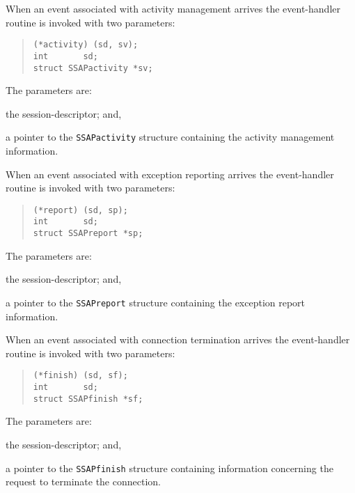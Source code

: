 When an event associated with activity management arrives
the event-handler routine is invoked with two parameters:
\begin{quote}\small\begin{verbatim}
(*activity) (sd, sv);
int       sd;
struct SSAPactivity *sv;
\end{verbatim}\end{quote}
The parameters are:
\begin{describe}
\item[\verb"sd":] the session-descriptor;
and,

\item[\verb"sv":] a pointer to the \verb"SSAPactivity" structure containing
the activity management information.
\end{describe}

When an event associated with exception reporting arrives
the event-handler routine is invoked with two parameters:
\begin{quote}\small\begin{verbatim}
(*report) (sd, sp);
int       sd;
struct SSAPreport *sp;
\end{verbatim}\end{quote}
The parameters are:
\begin{describe}
\item[\verb"sd":] the session-descriptor;
and,

\item[\verb"sp":] a pointer to the \verb"SSAPreport" structure containing
the exception report information.
\end{describe}

When an event associated with connection termination arrives
the event-handler routine is invoked with two parameters:
\begin{quote}\small\begin{verbatim}
(*finish) (sd, sf);
int       sd;
struct SSAPfinish *sf;
\end{verbatim}\end{quote}
The parameters are:
\begin{describe}
\item[\verb"sd":] the session-descriptor;
and,

\item[\verb"sf":] a pointer to the \verb"SSAPfinish" structure containing
information concerning the request to terminate the connection.
\end{describe}

